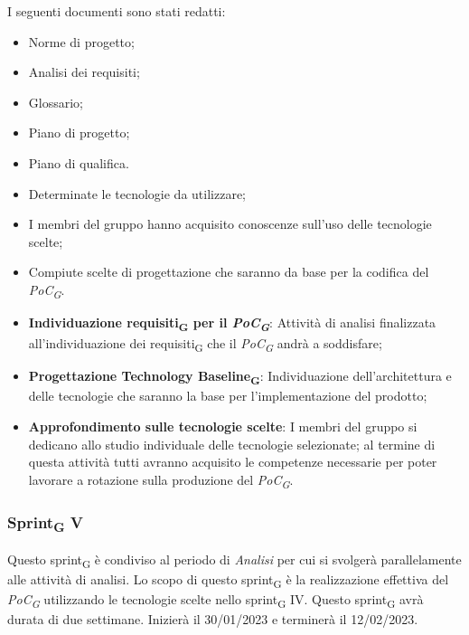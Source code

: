 I seguenti documenti sono stati redatti:
\begin{itemize}
	\item Norme di progetto;
	\item Analisi dei requisiti;
	\item Glossario;
    \item Piano di progetto;
	\item Piano di qualifica.
\end{itemize}

\:
\begin{itemize}
	\item Determinate le tecnologie da utilizzare;
	\item I membri del gruppo hanno acquisito conoscenze sull'uso delle tecnologie scelte;
	\item Compiute scelte di progettazione che saranno da base per la codifica del \textit{PoC\textsubscript{G}}.
\end{itemize}

\:
\begin{itemize}
	\item \textbf{Individuazione requisiti\textsubscript{G} per il \textit{PoC\textsubscript{G}}}: Attività di analisi finalizzata all’individuazione dei requisiti\textsubscript{G} che il \textit{PoC\textsubscript{G}} andrà a soddisfare;
    \item \textbf{Progettazione Technology Baseline\textsubscript{G}}: Individuazione dell’architettura e delle tecnologie che saranno la base per l’implementazione del prodotto;
    \item \textbf{Approfondimento sulle tecnologie scelte}: I membri del gruppo si dedicano allo studio individuale delle tecnologie selezionate; al termine di questa attività tutti avranno acquisito le competenze necessarie per poter lavorare a rotazione sulla produzione del \textit{PoC\textsubscript{G}}.
\end{itemize}

\subsubsection{Sprint\textsubscript{G} V}
Questo sprint\textsubscript{G} è condiviso al periodo di \textit{Analisi} per cui si svolgerà parallelamente alle attività di analisi. 
Lo scopo di questo sprint\textsubscript{G} è la realizzazione effettiva del \textit{PoC\textsubscript{G}} utilizzando le tecnologie scelte nello sprint\textsubscript{G} IV.
Questo sprint\textsubscript{G} avrà durata di due settimane. Inizierà il 30/01/2023 e terminerà il 12/02/2023.

